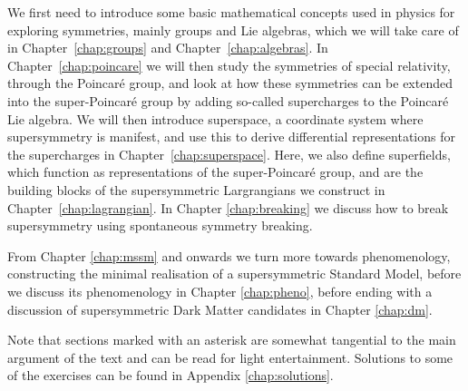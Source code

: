 \documentclass[11pt,a4paper]{book}
\begin{document}
We first need to introduce some basic mathematical concepts used in physics for exploring symmetries, mainly groups and Lie algebras, which we will take care of in Chapter~\ref{chap:groups} and  Chapter~\ref{chap:algebras}. 
In Chapter~\ref{chap:poincare} we will then study the symmetries of special relativity, through the Poincaré group, and look at how these symmetries can be extended into the super-Poincaré group by adding so-called supercharges to the Poincaré Lie algebra.
We will then introduce superspace, a coordinate system where supersymmetry is manifest, and use this to derive differential representations for the supercharges in Chapter~\ref{chap:superspace}. Here, we also define superfields, which function as representations of the super-Poincaré group, and are the building blocks of the supersymmetric Largrangians we construct in Chapter~\ref{chap:lagrangian}. In Chapter \ref{chap:breaking} we discuss how to break supersymmetry using spontaneous symmetry breaking.

From Chapter \ref{chap:mssm} and onwards we turn more towards phenomenology, constructing the minimal realisation of a supersymmetric Standard Model, before we discuss its phenomenology in Chapter \ref{chap:pheno}, before ending with a discussion of supersymmetric Dark Matter candidates in Chapter \ref{chap:dm}.

Note that sections marked with an asterisk are somewhat tangential to the main argument of the text and can be read for light entertainment. Solutions to some of the exercises can be found in Appendix \ref{chap:solutions}.




















\end{document}
